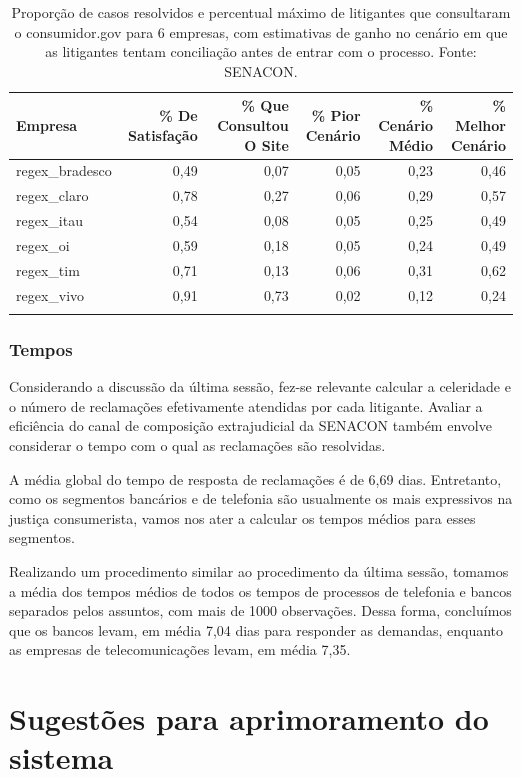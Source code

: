 \documentclass[]{report}
\begin{document}
\begin{longtable}{lrrrrr}
\caption{Proporção de casos resolvidos e percentual máximo de litigantes que consultaram o consumidor.gov para 6 empresas, com estimativas de ganho no cenário em que as litigantes tentam conciliação antes de entrar com o processo. Fonte: SENACON.} \\
  \hline
Empresa & \% De Satisfação & \% Que Consultou O Site & \% Pior Cenário & \% Cenário Médio & \% Melhor Cenário \\
  \hline
regex\_bradesco & 0,49 & 0,07 & 0,05 & 0,23 & 0,46 \\
  regex\_claro & 0,78 & 0,27 & 0,06 & 0,29 & 0,57 \\
  regex\_itau & 0,54 & 0,08 & 0,05 & 0,25 & 0,49 \\
  regex\_oi & 0,59 & 0,18 & 0,05 & 0,24 & 0,49 \\
  regex\_tim & 0,71 & 0,13 & 0,06 & 0,31 & 0,62 \\
  regex\_vivo & 0,91 & 0,73 & 0,02 & 0,12 & 0,24 \\
   \hline
\hline
\label{unnamed-chunk-100}
\end{longtable}

\subsection{Tempos}\label{tempos}

Considerando a discussão da última sessão, fez-se relevante calcular a
celeridade e o número de reclamações efetivamente atendidas por cada
litigante. Avaliar a eficiência do canal de composição extrajudicial da
SENACON também envolve considerar o tempo com o qual as reclamações são
resolvidas.

A média global do tempo de resposta de reclamações é de 6,69 dias.
Entretanto, como os segmentos bancários e de telefonia são usualmente os
mais expressivos na justiça consumerista, vamos nos ater a calcular os
tempos médios para esses segmentos.

Realizando um procedimento similar ao procedimento da última sessão,
tomamos a média dos tempos médios de todos os tempos de processos de
telefonia e bancos separados pelos assuntos, com mais de 1000
observações. Dessa forma, concluímos que os bancos levam, em média 7,04
dias para responder as demandas, enquanto as empresas de
telecomunicações levam, em média 7,35.

\hypertarget{sugestoes-para-aprimoramento-do-sistema}{\chapter{Sugestões
para aprimoramento do
sistema}\label{sugestoes-para-aprimoramento-do-sistema}}
\end{document}
